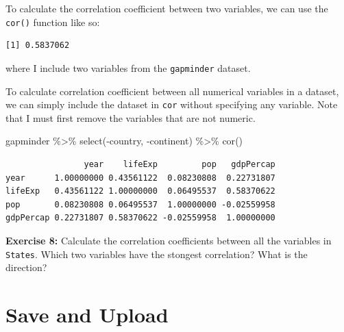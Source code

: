 \documentclass[
]{book}
\makeatletter
\newenvironment{Shaded}{\begin{snugshade}}{\end{snugshade}}
\newcommand{\FunctionTok}[1]{\textcolor[rgb]{0,0,0}{#1}}
\newcommand{\NormalTok}[1]{#1}
\newcommand{\SpecialCharTok}[1]{\textcolor[rgb]{0,0,0}{#1}}
\newenvironment{kframe}{%
\medskip{}
\setlength{\fboxsep}{.8em}
 \def\at@end@of@kframe{}%
 \ifinner\ifhmode%
  \def\at@end@of@kframe{\end{minipage}}%
  \begin{minipage}{\columnwidth}%
 \fi\fi%
 \def\FrameCommand##1{\hskip\@totalleftmargin \hskip-\fboxsep
 \colorbox{shadecolor}{##1}\hskip-\fboxsep
     \hskip-\linewidth \hskip-\@totalleftmargin \hskip\columnwidth}%
 \MakeFramed {\advance\hsize-\width
   \@totalleftmargin\z@ \linewidth\hsize
   \@setminipage}}%
 {\par\unskip\endMakeFramed%
 \at@end@of@kframe}
\renewenvironment{Shaded}{\begin{kframe}}{\end{kframe}}
\newenvironment{rmdblock}[1]
  {\begin{shaded*}
  }
  {\end{shaded*}
  }
\newenvironment{learncheck}
  {\begin{rmdblock}{warning}}
  {\end{rmdblock}}
\makeatother
\begin{document}
To calculate the correlation coefficient between two variables, we can use the \texttt{cor()} function like so:

\begin{Shaded}
\end{Shaded}

\begin{verbatim}
[1] 0.5837062
\end{verbatim}

where I include two variables from the \texttt{gapminder} dataset.

To calculate correlation coefficient between all numerical variables in a dataset, we can simply include the dataset in \texttt{cor} without specifying any variable. Note that I must first remove the variables that are not numeric.

\begin{Shaded}
\begin{Highlighting}[]
\NormalTok{gapminder }\SpecialCharTok{\%\textgreater{}\%} 
  \FunctionTok{select}\NormalTok{(}\SpecialCharTok{{-}}\NormalTok{country, }\SpecialCharTok{{-}}\NormalTok{continent) }\SpecialCharTok{\%\textgreater{}\%} 
  \FunctionTok{cor}\NormalTok{()}
\end{Highlighting}
\end{Shaded}

\begin{verbatim}
                year    lifeExp         pop   gdpPercap
year      1.00000000 0.43561122  0.08230808  0.22731807
lifeExp   0.43561122 1.00000000  0.06495537  0.58370622
pop       0.08230808 0.06495537  1.00000000 -0.02559958
gdpPercap 0.22731807 0.58370622 -0.02559958  1.00000000
\end{verbatim}

\begin{learncheck}
\textbf{Exercise 8:} Calculate the correlation coefficients between all
the variables in \texttt{States}. Which two variables have the stongest
correlation? What is the direction?
\end{learncheck}

\hypertarget{save-and-upload}{%
\section{Save and Upload}\label{save-and-upload}}
\end{document}
